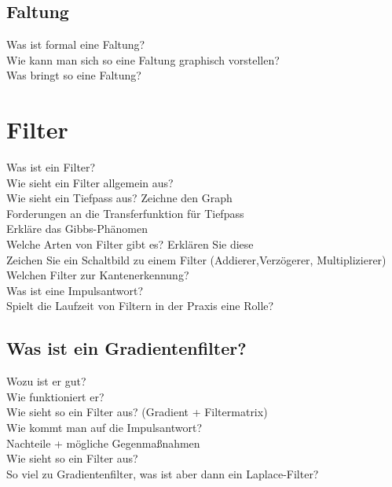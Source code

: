 \subsection{Faltung}
\begin{description}
  \item[Was ist formal eine Faltung?]
  \item[Wie kann man sich so eine Faltung graphisch vorstellen?]
  \item[Was bringt so eine Faltung?]
\end{description}
\section{Filter}
\begin{description}
	\item[Was ist ein Filter?]
	\item[Wie sieht ein Filter allgemein aus?]
	\item[Wie sieht ein Tiefpass aus? Zeichne den Graph]
	\item[Forderungen an die Transferfunktion für Tiefpass]
	\item[Erkläre das Gibbs-Phänomen]
	\item[Welche Arten von Filter gibt es? Erklären Sie diese]
	\item[Zeichen Sie ein Schaltbild zu einem Filter (Addierer,Verzögerer, Multiplizierer)]
	\item[Welchen Filter zur Kantenerkennung?]
	\item[Was ist eine Impulsantwort?]
	\item[Spielt die Laufzeit von Filtern in der Praxis eine Rolle?]
\end{description}
\subsection{Was ist ein Gradientenfilter?}
\begin{description}
	\item[Wozu ist er gut?]
	\item[Wie funktioniert er?]
	\item[Wie sieht so ein Filter aus? (Gradient + Filtermatrix)]
	\item[Wie kommt man auf die Impulsantwort?]
	\item[Nachteile + mögliche Gegenmaßnahmen]
	\item[Wie sieht so ein Filter aus?]
    \item[So viel zu Gradientenfilter, was ist aber dann ein Laplace-Filter?]
\end{description}
